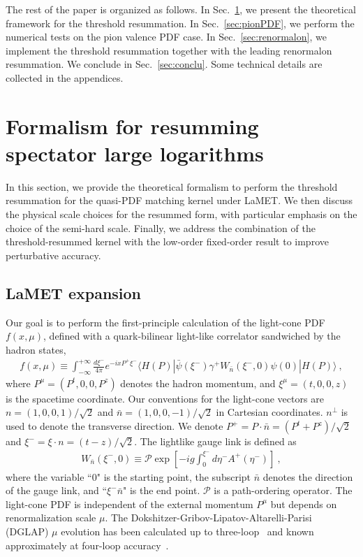 \documentclass[a4paper,11pt]{article}
\begin{document}
The rest of the paper is organized as follows. In Sec.~\ref{sec:theory}, we present the theoretical framework for the threshold resummation. In Sec.~\ref{sec:pionPDF}, we perform the numerical tests on the pion valence PDF case. In Sec.~\ref{sec:renormalon}, we implement the threshold resummation together with the leading renormalon resummation. We conclude in Sec.~\ref{sec:conclu}. Some technical details are collected in the appendices.


\section{Formalism for resumming spectator large logarithms}\label{sec:theory}

In this section, we provide the theoretical formalism to perform the threshold resummation for the quasi-PDF matching kernel under LaMET. We then discuss the physical scale choices for the resummed form, with particular emphasis on the choice of the semi-hard scale. Finally, we address the combination of the threshold-resummed kernel with the low-order fixed-order result to improve perturbative accuracy.

\subsection{LaMET expansion}\label{sec:LaMexp}
Our goal is to perform the first-principle calculation of the light-cone PDF $f(x,\mu)$, defined with a quark-bilinear light-like correlator sandwiched by the hadron states,
\begin{align}\label{eq:LCpdf}
    f(x,\mu) \equiv \int_{-\infty}^{+\infty} \frac{d \xi^{-}}{4\pi} e^{- i x P^{+} \xi^{-}} 
    \langle H(P) | \bar{\psi}(\xi^{-}) \gamma^{+} W_{\bar{n}}(\xi^{-},0) \psi(0) | H(P) \rangle \ ,
\end{align}
where $P^{\mu} = (P^{t},0,0,P^{z})$ denotes the hadron momentum, and $\xi^{\mu}=(t,0,0,z)$ is the spacetime coordinate. Our conventions for the light-cone vectors are $n = (1,0,0,1)/\sqrt{2}$ and $\bar{n} = (1,0,0,-1)/\sqrt{2}$ in Cartesian coordinates. $n^{\perp}$ is used to denote the transverse direction. We denote $P^{+} = P\cdot \bar{n} = (P^{t}+P^{z})/\sqrt{2}$ and $\xi^{-} = \xi \cdot n = (t-z)/\sqrt{2}$. The lightlike gauge link is defined as
\begin{align}
    W_{\bar{n}}(\xi^{-},0) \equiv \mathcal{P} \exp\left[-i g \int_{0}^{\xi^{-}} d \eta^{-} A^{+}(\eta^{-})\right] \ ,
\end{align}
where the variable ``0" is the starting point, the subscript $\bar{n}$ denotes the direction of the gauge link, and ``$\xi^{-} \bar{n}$" is the end point. $\mathcal{P}$ is a path-ordering operator. The light-cone PDF is independent of the external momentum $P^{\mu}$ but depends on renormalization scale $\mu$. The Dokshitzer-Gribov-Lipatov-Altarelli-Parisi (DGLAP) $\mu$ evolution has been calculated up to three-loop~\cite{Moch:2004pa,Vogt:2004mw,Blumlein:2021enk} and known approximately at four-loop accuracy~\cite{Moch:2017uml,Falcioni:2023vqq,Falcioni:2023luc,Moch:2023tdj,Moch:2021qrk,Falcioni:2023tzp,Gehrmann:2023cqm,Gehrmann:2023iah,Falcioni:2024qpd}. 
\end{document}

